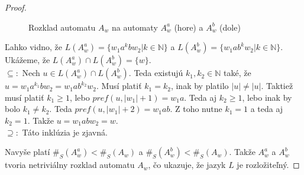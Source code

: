 \begin{proof}
\begin{figure}[H]
\centering
{}

\caption{Rozklad automatu $ A_w $ na automaty $ A_w^a $ (hore) a $ A_w^b $ (dole)}
\end{figure}

Ľahko vidno, že $ L(A_w^a) = \lbrace w_1a^kbw_2 | k \in \mathbb{N} \rbrace $ a $ L(A_w^b) = \lbrace w_1ab^kw_2 | k \in \mathbb{N} \rbrace$. Ukážeme, že $ L(A_w^a) \cap L(A_w^b) = \lbrace w \rbrace $. \\ 
$ \subseteq: $ Nech $ u \in L(A_w^a) \cap L(A_w^b)  $. Teda existujú $ k_1,k_2 \in \mathbb{N} $ také, že $ u = w_1a^{k_1}bw_2 = w_1ab^{k_2}w_2 $. Musí platiť $ k_1 = k_2 $, inak by platilo $ |u| \neq |u| $. Taktiež musí platiť $ k_1 \geq 1 $, lebo $ pref(u,|w_1|+1) = w_1a $. Teda aj $ k_2 \geq 1 $, lebo inak by bolo $ k_1 \neq k_2 $. Teda $ pref(u,|w_1|+2) = w_1ab $. Z toho nutne $ k_1 = 1 $ a teda aj $ k_2 = 1 $. Takže $ u = w_1abw_2 = w $. \\
$ \supseteq: $ Táto inklúzia je zjavná.
\par
Navyše platí $ \#_S(A_w^a) < \#_S(A_w) $ a $ \#_S(A_w^b) < \#_S(A_w) $. Takže $ A_w^a $ a $ A_w^b $ tvoria netriviálny rozklad automatu $ A_w $, čo ukazuje, že jazyk $ L $ je rozložiteľný.

\end{proof}















